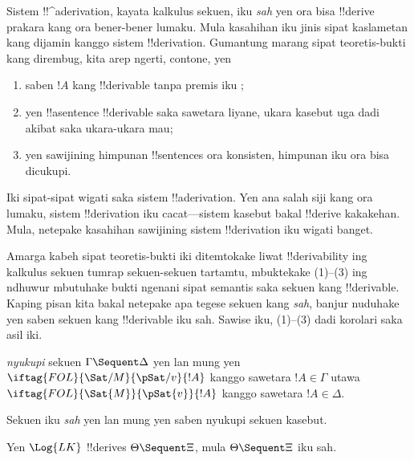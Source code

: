 \documentclass[../../../include/open-logic-section]{subfiles}
\begin{document}
      {}
      {}


\begin{explain}
Sistem !!^a{derivation}, kayata kalkulus sekuen, iku \emph{sah}
yen ora bisa !!{derive} prakara kang ora bener-bener lumaku. Mula
kasahihan iku jinis sipat kaslametan kang dijamin kanggo sistem
!!{derivation}. Gumantung marang sipat teoretis-bukti kang dirembug,
kita arep ngerti, contone, yen
\begin{enumerate}
\item saben $!A$ kang !!{derivable} tanpa premis iku ;
\item yen !!a{sentence} !!{derivable} saka sawetara liyane, ukara
  kasebut uga dadi akibat saka ukara-ukara mau;
\item yen sawijining himpunan !!{sentence}s ora konsisten, himpunan iku
  ora bisa dicukupi.
\end{enumerate}
Iki sipat-sipat wigati saka sistem !!a{derivation}. Yen ana salah siji
kang ora lumaku, sistem !!{derivation} iku cacat---sistem kasebut bakal
!!{derive} kakakehan. Mula, netepake kasahihan sawijining sistem
!!{derivation} iku wigati banget.

Amarga kabeh sipat teoretis-bukti iki ditemtokake liwat
!!{derivability} ing kalkulus sekuen tumrap sekuen-sekuen tartamtu,
mbuktekake (1)--(3) ing ndhuwur mbutuhake bukti ngenani sipat semantis
saka sekuen kang !!{derivable}. Kaping pisan kita bakal netepake apa
tegese sekuen kang \emph{sah}, banjur nuduhake yen saben sekuen kang
!!{derivable} iku sah. Sawise iku, (1)--(3) dadi korolari saka asil
iki. 
\end{explain}

\begin{defn}
 \emph{nyukupi} sekuen
$\Gamma \Sequent \Delta$ yen lan mung yen
$\iftag{FOL}{\Sat/{M}}{\pSat/{v}}{!A}$ kanggo sawetara $!A \in \Gamma$
utawa $\iftag{FOL}{\Sat{M}}{\pSat{v}}{!A}$ kanggo sawetara $!A \in
\Delta$.

Sekuen iku \emph{sah} yen lan mung yen saben
nyukupi sekuen kasebut.
\end{defn}

\begin{thm}[Kasahihan]
 Yen $\Log{LK}$ !!{derive}s $\Theta
\Sequent \Xi$, mula $\Theta \Sequent \Xi$ iku sah.
\end{thm}
\end{document}
